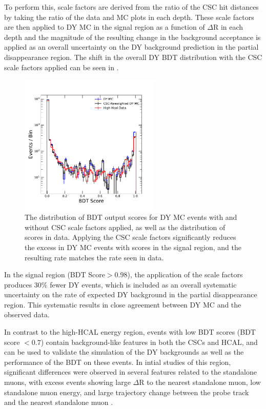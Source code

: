 To perform this, scale factors are derived from the ratio of the CSC hit distances by taking the ratio of the data and MC plots in each depth. 
These scale factors are then applied to DY MC in the signal region as a function of $\Delta$R in each depth and the magnitude of the resulting change in the background acceptance is applied as an overall uncertainty on the DY background prediction in the partial disappearance region. 
The shift in the overall DY BDT distribution with the CSC scale factors applied can be seen in .

\begin{figure}[htbp]
	\label{fig:BDTsfvalid}
	\centering
	\includegraphics[width=0.6\textwidth]{figures/highHcal_cscReweight.pdf}
        \caption[BDT Score Variance with Applied CSC Scale Factors]{The distribution of BDT output scores for DY MC events with and without CSC scale factors applied, as well as the distribution of scores in data. Applying the CSC scale factors significantly reduces the excess in DY MC events with scores in the signal region, and the resulting rate matches the rate seen in data.}
\end{figure}

In the signal region (BDT Score$>0.98$), the application of the scale factors produces 30$\%$ fewer DY events, which is included as an overall systematic uncertainty on the rate of expected DY background in the partial disappearance region. 
This systematic results in close agreement between DY MC and the observed data.

In contrast to the high-HCAL energy region, events with low BDT scores (BDT score $<0.7$) contain background-like features in both the CSCs and HCAL, and can be used to validate the simulation of the DY backgrounds as well as the performance of the BDT on these events.
In intial studies of this region, significant differences were observed in several features related to the standalone muons, with excess events showing large $\Delta$R to the nearest standalone muon, low standalone muon energy, and large trajectory change between the probe track and the nearest standalone muon .

